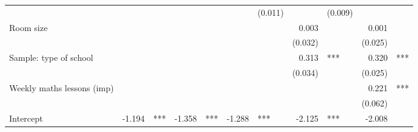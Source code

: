 \documentclass{article}
\begin{document}
\begin{table}[!h]
\begin{tabular}{lllllllllll}
  \multicolumn{1}{r}{} &
  \multicolumn{1}{l}{} &
  \multicolumn{1}{r}{} &
  \multicolumn{1}{l}{} &
  \multicolumn{1}{r}{} &
  \multicolumn{1}{l}{} &
  \multicolumn{1}{r}{(0.011)} &
  \multicolumn{1}{l}{} &
  \multicolumn{1}{r}{(0.009)} &
  \multicolumn{1}{l}{} \\
\multicolumn{1}{l}{Room size} &
  \multicolumn{1}{r}{} &
  \multicolumn{1}{l}{} &
  \multicolumn{1}{r}{} &
  \multicolumn{1}{l}{} &
  \multicolumn{1}{r}{} &
  \multicolumn{1}{l}{} &
  \multicolumn{1}{r}{0.003} &
  \multicolumn{1}{l}{} &
  \multicolumn{1}{r}{0.001} &
  \multicolumn{1}{l}{} \\
\multicolumn{1}{l}{} &
  \multicolumn{1}{r}{} &
  \multicolumn{1}{l}{} &
  \multicolumn{1}{r}{} &
  \multicolumn{1}{l}{} &
  \multicolumn{1}{r}{} &
  \multicolumn{1}{l}{} &
  \multicolumn{1}{r}{(0.032)} &
  \multicolumn{1}{l}{} &
  \multicolumn{1}{r}{(0.025)} &
  \multicolumn{1}{l}{} \\
\multicolumn{1}{l}{Sample: type of school} &
  \multicolumn{1}{r}{} &
  \multicolumn{1}{l}{} &
  \multicolumn{1}{r}{} &
  \multicolumn{1}{l}{} &
  \multicolumn{1}{r}{} &
  \multicolumn{1}{l}{} &
  \multicolumn{1}{r}{0.313} &
  \multicolumn{1}{l}{***} &
  \multicolumn{1}{r}{0.320} &
  \multicolumn{1}{l}{***} \\
\multicolumn{1}{l}{} &
  \multicolumn{1}{r}{} &
  \multicolumn{1}{l}{} &
  \multicolumn{1}{r}{} &
  \multicolumn{1}{l}{} &
  \multicolumn{1}{r}{} &
  \multicolumn{1}{l}{} &
  \multicolumn{1}{r}{(0.034)} &
  \multicolumn{1}{l}{} &
  \multicolumn{1}{r}{(0.025)} &
  \multicolumn{1}{l}{} \\
\multicolumn{1}{l}{Weekly maths lessons (imp)} &
  \multicolumn{1}{r}{} &
  \multicolumn{1}{l}{} &
  \multicolumn{1}{r}{} &
  \multicolumn{1}{l}{} &
  \multicolumn{1}{r}{} &
  \multicolumn{1}{l}{} &
  \multicolumn{1}{r}{} &
  \multicolumn{1}{l}{} &
  \multicolumn{1}{r}{0.221} &
  \multicolumn{1}{l}{***} \\
\multicolumn{1}{l}{} &
  \multicolumn{1}{r}{} &
  \multicolumn{1}{l}{} &
  \multicolumn{1}{r}{} &
  \multicolumn{1}{l}{} &
  \multicolumn{1}{r}{} &
  \multicolumn{1}{l}{} &
  \multicolumn{1}{r}{} &
  \multicolumn{1}{l}{} &
  \multicolumn{1}{r}{(0.062)} &
  \multicolumn{1}{l}{} \\
\multicolumn{1}{l}{Intercept} &
  \multicolumn{1}{r}{-1.194} &
  \multicolumn{1}{l}{***} &
  \multicolumn{1}{r}{-1.358} &
  \multicolumn{1}{l}{***} &
  \multicolumn{1}{r}{-1.288} &
  \multicolumn{1}{l}{***} &
  \multicolumn{1}{r}{-2.125} &
  \multicolumn{1}{l}{***} &
  \multicolumn{1}{r}{-2.008} &

\end{tabular}
\end{table}
\end{document}
